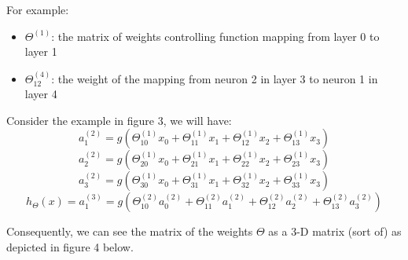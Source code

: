 \documentclass[12pt]{article}
\begin{document}
	For example:
	\begin{itemize}
		\item $\Theta^{(1)}$: the matrix of weights controlling function mapping from layer 0 to layer 1
		\item $\Theta_{12}^{(4)}$: the weight of the mapping from neuron 2 in layer 3 to neuron 1 in layer 4 
	\end{itemize}	

	Consider the example in figure 3, we will have:
	\begin{equation}
		a_1^{(2)} = g(\Theta_{10}^{(1)} x_0 + \Theta_{11}^{(1)} x_1 + \Theta_{12}^{(1)} x_2 + \Theta_{13}^{(1)} x_3)	
	\end{equation}
	\begin{equation}
		a_2^{(2)} = g(\Theta_{20}^{(1)} x_0 + \Theta_{21}^{(1)} x_1 + \Theta_{22}^{(1)} x_2 + \Theta_{23}^{(1)} x_3)
	\end{equation}
	\begin{equation}
		a_3^{(2)} = g(\Theta_{30}^{(1)} x_0 + \Theta_{31}^{(1)} x_1 + \Theta_{32}^{(1)} x_2 + \Theta_{33}^{(1)} x_3)
	\end{equation}
	\begin{equation}
		h_\Theta (x) = a_1^{(3)}  = g(\Theta_{10}^{(2)} a_0^{(2)} + \Theta_{11}^{(2)} a_1^{(2)} + \Theta_{12}^{(2)} a_2^{(2)} + \Theta_{13}^{(2)} a_3^{(2)})
	\end{equation}
	
	Consequently, we can see the matrix of the weights $\Theta$ as a 3-D matrix (sort of) as depicted in figure 4 below.
	
	\begin{center}
		\label{labelname}
	\end{center}
	
\end{document}

